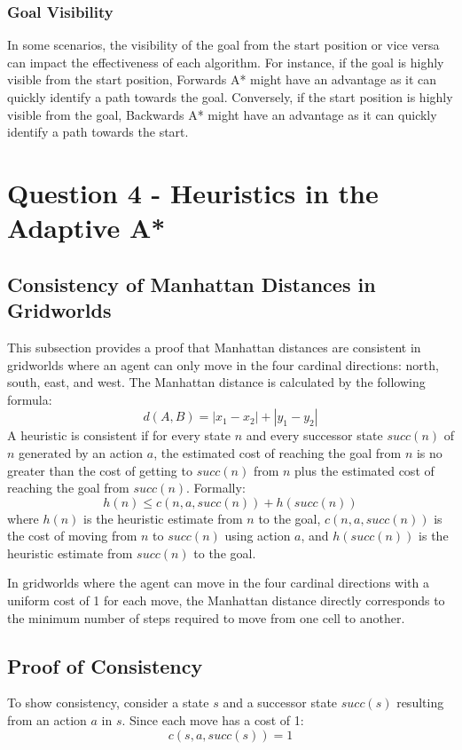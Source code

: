 \documentclass{article}
\begin{document}
\subsubsection{Goal Visibility}
In some scenarios, the visibility of the goal from the start position or vice versa can impact the effectiveness of each algorithm. For instance, if the goal is highly visible from the start position, Forwards A* might have an advantage as it can quickly identify a path towards the goal. Conversely, if the start position is highly visible from the goal, Backwards A* might have an advantage as it can quickly identify a path towards the start.

\section{Question 4 - Heuristics in the Adaptive A*}

\subsection{Consistency of Manhattan Distances in Gridworlds}
This subsection provides a proof that Manhattan distances are consistent in gridworlds where an agent can only move in the four cardinal directions: north, south, east, and west. The Manhattan distance is calculated by the following formula: \[d(A, B) = |x_1 - x_2| + |y_1 - y_2|\]
A heuristic is consistent if for every state \(n\) and every successor state \(succ(n)\) of \(n\) generated by an action \(a\), the estimated cost of reaching the goal from \(n\) is no greater than the cost of getting to \(succ(n)\) from \(n\) plus the estimated cost of reaching the goal from \(succ(n)\). Formally:
\[h(n) \leq c(n, a, succ(n)) + h(succ(n))\]
where \(h(n)\) is the heuristic estimate from \(n\) to the goal, \(c(n, a, succ(n))\) is the cost of moving from \(n\) to \(succ(n)\) using action \(a\), and \(h(succ(n))\) is the heuristic estimate from \(succ(n)\) to the goal.

In gridworlds where the agent can move in the four cardinal directions with a uniform cost of 1 for each move, the Manhattan distance directly corresponds to the minimum number of steps required to move from one cell to another. 

\subsection{Proof of Consistency}

To show consistency, consider a state \(s\) and a successor state \(succ(s)\) resulting from an action \(a\) in \(s\). Since each move has a cost of 1:
\[c(s, a, succ(s)) = 1\]
\end{document}
